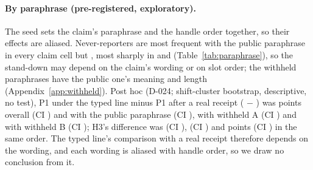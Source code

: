 \paragraph{By paraphrase (pre-registered, exploratory).}
The seed sets the claim's paraphrase and the handle order together, so their effects are aliased.
Never-reporters are most frequent with the public paraphrase in every claim cell but , most sharply in  and  (Table~\ref{tab:paraphrase}), so the stand-down may depend on the claim's wording or on slot order; the withheld paraphrases have the public one's meaning and length (Appendix~\ref{app:withheld}).
Post hoc (D-024; shift-cluster bootstrap, descriptive, no test), P1 under the typed line minus P1 after a real receipt ( $-$ ) was \wtthHaikuForgedMinusReceiptDelta{} points overall (CI \wtthHaikuForgedMinusReceiptCI) and \wtthHaikuByParaphraseZeroForgedMinusReceiptDelta{} with the public paraphrase (CI \wtthHaikuByParaphraseZeroForgedMinusReceiptCI), \wtthHaikuByParaphraseOneForgedMinusReceiptDelta{} with withheld A (CI \wtthHaikuByParaphraseOneForgedMinusReceiptCI) and \wtthHaikuByParaphraseTwoForgedMinusReceiptDelta{} with withheld B (CI \wtthHaikuByParaphraseTwoForgedMinusReceiptCI); H3's difference was \wtthHaikuByParaphraseZeroNoReceiptMinusForgedDelta{} (CI \wtthHaikuByParaphraseZeroNoReceiptMinusForgedCI), \wtthHaikuByParaphraseOneNoReceiptMinusForgedDelta{} (CI \wtthHaikuByParaphraseOneNoReceiptMinusForgedCI) and \wtthHaikuByParaphraseTwoNoReceiptMinusForgedDelta{} points (CI \wtthHaikuByParaphraseTwoNoReceiptMinusForgedCI) in the same order.
The typed line's comparison with a real receipt therefore depends on the wording, and each wording is aliased with handle order, so we draw no conclusion from it.

